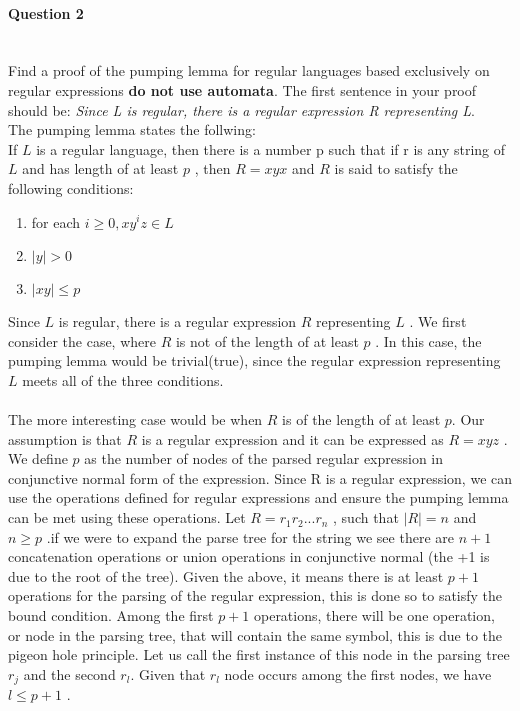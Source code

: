 \documentclass{report}
\newcommand{\me}[1]{
\begin{math}
#1
\end{math}
}
\begin{document}
 
 
 
 
\paragraph{\Large{Question 2\\ \\}}
Find a proof of the pumping lemma for regular languages based exclusively on regular expressions \textbf{do not use automata}. The first sentence in your proof should be: \textit{Since L is regular, there is a regular expression R representing L}. \\


The pumping lemma states the follwing: \\
If \me{L} is a regular language, then there is a number p such that if r is any string of \me{L} and has length of at least \me{p}, then  \me{R=xyx} and \me{R} is said to satisfy the following conditions:
\begin{enumerate}
  \item for each \me{i \geq 0, xy^i z \in L} 
  \item \me{|y| > 0}
  \item \me{|xy| \leq p}
\end{enumerate}


Since \me{L} is regular, there is a regular expression \me{R} representing \me{L}. We first consider the case, where \me{R} is not of the length of at least \me{p}. In this case, the pumping lemma would be trivial(true), since the regular expression representing \me{L} meets all of the three conditions. 
\\ \\
 The more interesting case would be when \me{R} is of the length of at least \me{p.} Our assumption is that \me{R} is a regular expression and it can be expressed as \me{R = xyz}. We define \me{p} as the number of nodes of the parsed regular expression in conjunctive normal form of the expression. Since R is a regular expression, we can use the operations defined for regular expressions and ensure the pumping lemma can be met using these operations. Let \me{R = r_1r_2...r_n}, such that \me{|R| = n} and \me{n \geq p}.if we were to expand the parse tree for the string we see there are\me{n+1} concatenation operations or union operations in conjunctive normal (the +1 is due to the root of the tree). Given the above, it means there is at least \me{p+1} operations for the parsing of the regular expression, this is done so to satisfy the bound condition. Among the first \me{p+1} operations, there will be one operation, or node in the parsing  tree, that will contain the same symbol, this is due to the pigeon hole principle. Let us call the first instance of this node in the parsing tree \me{r_j} and the  second \me{r_l.} Given that \me{r_l} node occurs among the first nodes, we have \me{l \leq p+1}. \\
 
\end{document}
